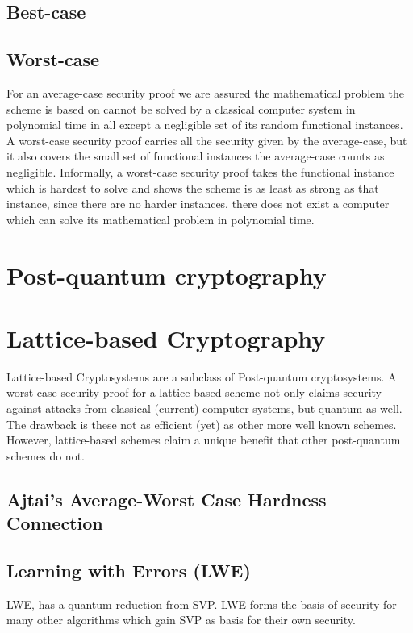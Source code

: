 \subsection{Best-case}

\subsection{Worst-case} 
For an average-case security proof we are assured the mathematical problem
the scheme is based on cannot be solved by a classical computer system in polynomial time in all except a negligible set of its random functional instances.
A worst-case security proof carries all the security given by the average-case, but it also covers the small set of functional instances the average-case counts as negligible. 
\newline
Informally, a worst-case security proof takes the functional instance which is
hardest to solve and shows the scheme is as least as strong as that
instance, since there are no harder instances, there does not exist
a computer which can solve its mathematical problem in polynomial time.

\section{Post-quantum cryptography} 


\section{Lattice-based Cryptography} 
Lattice-based Cryptosystems are a subclass of Post-quantum cryptosystems. A worst-case security proof for a lattice based scheme not only claims security against attacks from classical (current) computer systems, but quantum as well. The drawback is these not as efficient (yet) as other more well known schemes. However, lattice-based schemes claim a unique benefit that other post-quantum schemes do not. 

\subsection{Ajtai's Average-Worst Case Hardness Connection}

\subsection{Learning with Errors (LWE)}

LWE, has a quantum reduction from SVP. LWE forms the basis of security for many other algorithms which gain SVP as basis for their own security.
 
